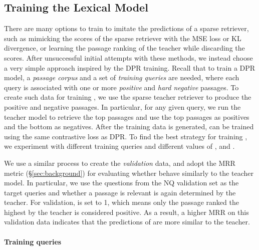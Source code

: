 \documentclass[11pt]{article}
\newcommand{\lexmodel}{Lexical Model}
\newcommand{\lexmodelsymbol}{\xspace}
\newcommand{\secref}[1]{\S\ref{#1}}
\begin{document}
\subsection{Training the \lexmodel{} \lexmodelsymbol{}}\label{sec:spar_model:data}

There are many options to train \lexmodelsymbol{} to imitate the predictions of a sparse retriever, such as mimicking the scores of the sparse retriever with the MSE loss or KL divergence, or learning the passage ranking of the teacher while discarding the scores.
After unsuccessful initial attempts with these methods, we instead choose a very simple approach inspired by the DPR training. 
Recall that to train a DPR model, a \emph{passage corpus} and a set of \emph{training queries} are needed, where each query is associated with one or more \emph{positive} and \emph{hard negative} passages.
To create such data for training \lexmodelsymbol{}, we use the sparse teacher retriever to produce the positive and negative passages.
In particular, for any given query, we run the teacher model to retrieve the top  passages and use the top  passages as positives and the bottom  as negatives.
After the training data is generated, \lexmodelsymbol{} can be trained using the same contrastive loss as DPR.
To find the best strategy for training \lexmodelsymbol, we experiment with different training queries and different values of ,  and .

We use a similar process to create the \emph{validation} data, and adopt the MRR metric (\secref{sec:background}) for evaluating whether \lexmodelsymbol{} behave similarly to the teacher model.
In particular, we use the questions from the NQ validation set as the target queries and whether a passage is relevant is again determined by the teacher.
For validation,  is set to 1, which means only the passage ranked the highest by the teacher is considered positive.
As a result, a higher MRR on this validation data indicates that the predictions of \lexmodelsymbol{} are more similar to the teacher.

\paragraph{Training queries}
\end{document}
